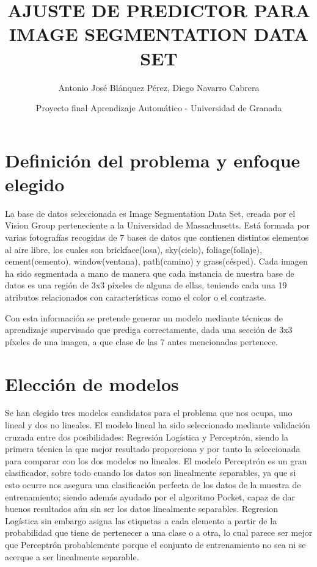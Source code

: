 \documentclass{article}
\title{AJUSTE DE PREDICTOR PARA IMAGE SEGMENTATION DATA SET}
\author{Antonio José Blánquez Pérez, Diego Navarro Cabrera}
\date{Proyecto final Aprendizaje Automático - Universidad de Granada}
\begin{document}
 \setlength{\parskip}{1em} 

	\maketitle
	  \tableofcontents
  \newpage
	

	\section{Definición del problema y enfoque elegido}

	La base de datos seleccionada es Image Segmentation Data Set, creada por el Vision Group perteneciente a la Universidad de Massachusetts. Está formada por varias fotografías recogidas de 7 bases de datos que contienen distintos elementos al aire libre, los cuales son brickface(losa), sky(cielo), foliage(follaje), cement(cemento), window(ventana), path(camino) y grass(césped). Cada imagen ha sido segmentada a mano de manera que cada instancia de nuestra base de datos es una región de 3x3 píxeles de alguna de ellas, teniendo cada una 19 atributos relacionados con características como el color o el contraste. 
	\par
	Con esta información se pretende generar un modelo mediante técnicas de aprendizaje supervisado que prediga correctamente, dada una sección de 3x3 píxeles de una imagen, a que clase de las 7 antes mencionadas pertenece.
	
	\section{Elección de modelos}
	
	Se han elegido tres modelos candidatos para el problema que nos ocupa, uno lineal y dos no lineales. El modelo lineal ha sido seleccionado mediante validación cruzada entre dos posibilidades: Regresión Logística y Perceptrón, siendo la primera técnica la que mejor resultado proporciona y por tanto la seleccionada para comparar con los dos modelos no lineales. El modelo Perceptrón es un gran clasificador, sobre todo cuando los datos son linealmente separables, ya que si esto ocurre nos asegura una clasificación perfecta de los datos de la muestra de entrenamiento; siendo además ayudado por el algoritmo Pocket, capaz de dar buenos resultados aún sin ser los datos linealmente separables. Regresion Logística sin embargo asigna las etiquetas a cada elemento a partir de la probabilidad que tiene de pertenecer a una clase o a otra, lo cual parece ser mejor que Perceptrón probablemente porque el conjunto de entrenamiento no sea ni se acerque a ser linealmente separable.
		
\end{document}

